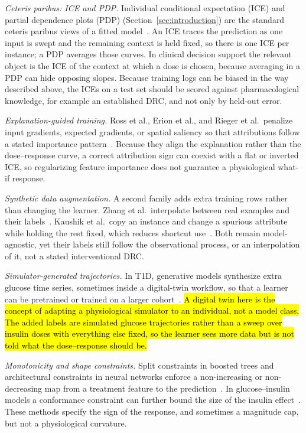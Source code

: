 \documentclass[a4paper,fleqn]{cas-sc}
\begin{document}
\noindent\textit{Ceteris paribus: ICE and PDP.}
Individual conditional expectation (ICE) and partial dependence plots (PDP)
(Section~\ref{sec:introduction}) are the standard ceteris paribus views of a
fitted model~\citep{goldstein2015,friedman2001}. An ICE traces the prediction as
one input is swept and the remaining context is held fixed, so there is one ICE
per instance; a PDP averages those curves. In clinical decision support the
relevant object is the ICE of the context at which a dose is chosen, because
averaging in a PDP can hide opposing slopes. Because training logs can be
biased in the way described above, the ICEs on a test set should be scored
against pharmacological knowledge, for example an established DRC, and not
only by held-out error.

\noindent\textit{Explanation-guided training.}
Ross et al., Erion et al., and Rieger et al.\ penalize input gradients, expected
gradients, or spatial saliency so that attributions follow a stated importance
pattern~\citep{ross2017,erion2021,rieger2020,selvaraju2019}. Because they align
the explanation rather than the dose--response curve, a correct attribution
sign can coexist with a flat or inverted ICE, so regularizing feature importance
does not guarantee a physiological what-if response.

\noindent\textit{Synthetic data augmentation.}
A second family adds extra training rows rather than changing the learner.
Zhang et al.\ interpolate between real examples and their
labels~\citep{zhang2018mixup}. Kaushik et al.\ copy an instance and change a
spurious attribute while holding the rest fixed, which reduces shortcut
use~\citep{kaushik2020cda}. Both remain model-agnostic, yet their labels still
follow the observational process, or an interpolation of it, not a stated
interventional DRC.

\noindent\textit{Simulator-generated trajectories.}
In T1D, generative models synthesize extra glucose time series, sometimes
inside a digital-twin workflow, so that a learner can be pretrained or trained
on a larger cohort~\citep{noguer2022,zhu2023glugan,prendin2025dt}. \hl{A digital
twin here is the concept of adapting a physiological simulator to an
individual, not a model class.} \hl{The added labels are simulated glucose
trajectories rather than a sweep over insulin doses with everything else
fixed, so the learner sees more data but is not told what the dose--response
should be.}

\noindent\textit{Monotonicity and shape constraints.}
Split constraints in boosted trees and architectural constraints in neural
networks enforce a non-increasing or non-decreasing map from a treatment feature
to the prediction~\citep{ke2017,runje2023}. In glucose--insulin models a
conformance constraint can further bound the size of the insulin
effect~\citep{kushner2020}. These methods specify the sign of the response, and
sometimes a magnitude cap, but not a physiological curvature.
\end{document}

